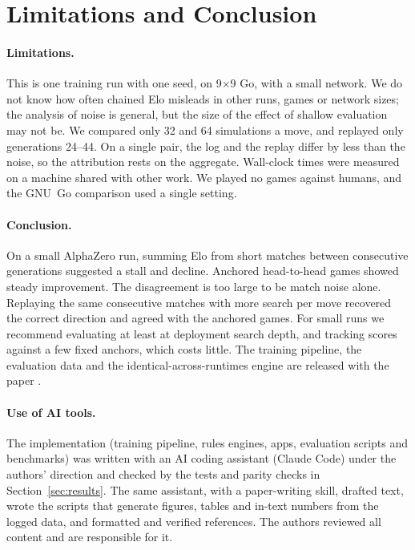 \section{Limitations and Conclusion}
\paragraph{Limitations.}
This is one training run with one seed, on 9$\times$9 Go, with a small network. We do not know how often
chained Elo misleads in other runs, games or network sizes; the analysis of noise is general, but the size
of the effect of shallow evaluation may not be. We compared only 32 and 64 simulations a move, and replayed only
generations 24--44. On a single pair, the log and the replay differ by less than the noise, so the attribution
rests on the aggregate. Wall-clock times were measured on a
machine shared with other work. We played no games against humans, and the GNU~Go comparison used a single
setting.

\paragraph{Conclusion.}
On a small AlphaZero run, summing Elo from short matches between consecutive generations suggested a
stall and decline. Anchored head-to-head games showed steady improvement. The disagreement is too large to
be match noise alone. Replaying the same consecutive matches with more search per move recovered the
correct direction and agreed with the anchored games. For small runs we recommend evaluating at least at
deployment search depth, and tracking scores against a few fixed anchors, which costs little. The training pipeline, the evaluation data and the identical-across-runtimes engine are
released with the paper .

\paragraph{Use of AI tools.}
The implementation (training pipeline, rules engines, apps, evaluation scripts and
benchmarks) was written with an AI coding assistant (Claude Code) under the authors' direction and checked by
the tests and parity checks in Section~\ref{sec:results}. The same assistant, with a paper-writing skill,
drafted text, wrote the scripts that generate figures, tables and in-text numbers from the logged data, and
formatted and verified references. The authors reviewed all content and are responsible for it.
